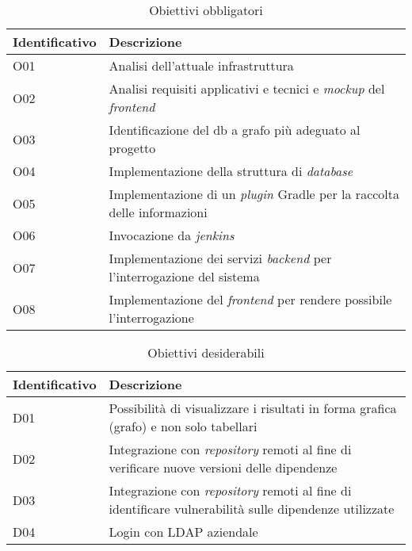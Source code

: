 \begin{table}[!h]
  \caption{Obiettivi obbligatori}
  \label{tab:obiettivi-obbligatori}
\begin{tabularx}{\textwidth}{lX}
   \textbf{Identificativo}&\textbf{Descrizione}\\ 
    \hline O01&Analisi dell'attuale infrastruttura\\
    \hline O02&Analisi requisiti applicativi e tecnici e \textit{mockup} del \textit{frontend}\\
    \hline O03&Identificazione del db a grafo più adeguato al progetto\\
    \hline O04&Implementazione della struttura di \textit{database}\\
    \hline O05&Implementazione di un \textit{plugin} Gradle per la raccolta delle informazioni\\
    \hline O06&Invocazione da \textit{jenkins}\\
    \hline O07&Implementazione dei servizi \textit{backend} per l'interrogazione del sistema\\
    \hline O08&Implementazione del \textit{frontend} per rendere possibile l'interrogazione\\
    \hline 
\end{tabularx}
\end{table}

  \begin{table}[!h]
    \caption{Obiettivi desiderabili}
    \label{tab:obiettivi-desiderabili}
    \begin{tabularx}{\textwidth}{lX}
    \textbf{Identificativo}&\textbf{Descrizione}\\ 
    \hline D01&Possibilità di visualizzare i risultati in forma grafica (grafo) e non solo tabellari\\
    \hline D02&Integrazione con \textit{repository} remoti al fine di verificare nuove versioni delle dipendenze\\
    \hline D03&Integrazione con \textit{repository} remoti al fine di identificare vulnerabilità sulle dipendenze utilizzate\\
    \hline D04&Login con LDAP aziendale\\  
    \hline
  \end{tabularx}
  \end{table}
